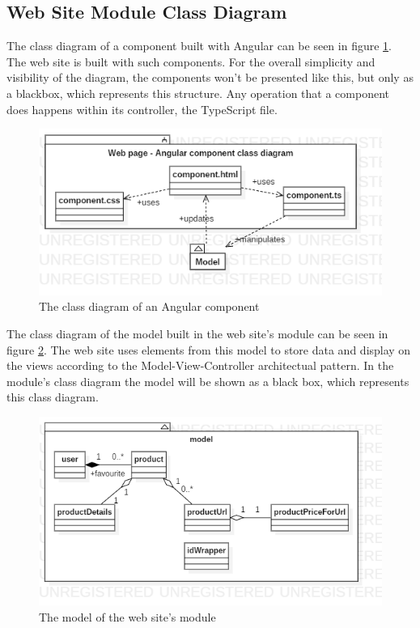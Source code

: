 \documentclass[12pt,a4paper,twoside]{report}
\begin{document}
\subsection{Web Site Module Class Diagram}

The class diagram of a component built with Angular can be seen in figure \ref{fig:app_class_angular_component}. The web site is built with such components. For the overall simplicity and visibility of the diagram, the components won't be presented like this, but only as a blackbox, which represents this structure. Any operation that a component does happens within its controller, the TypeScript file. 

\begin{figure}[ht]
  \centering
  \includegraphics[width=0.6\linewidth]{img/app_class_angular_component.png}
  \caption{The class diagram of an Angular component}
  \label{fig:app_class_angular_component}
\end{figure}

The class diagram of the model built in the web site's module can be seen in figure \ref{fig:app_class_angular_model}. The web site uses elements from this model to store data and display on the views according to the Model-View-Controller architectual pattern. In the module's class diagram the model will be shown as a black box, which represents this class diagram.

\begin{figure}[ht]
  \centering
  \includegraphics[width=0.6\linewidth]{img/app_class_angular_model.png}
  \caption{The model of the web site's module}
  \label{fig:app_class_angular_model}
\end{figure}
\end{document}
